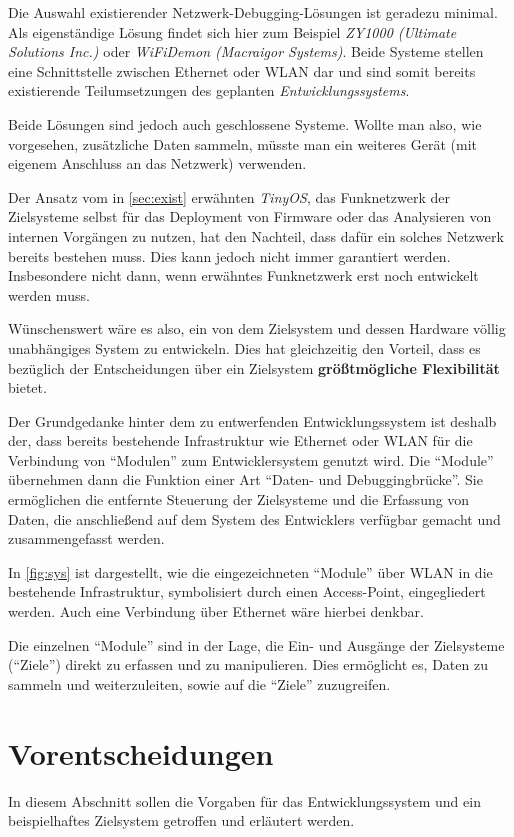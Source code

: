 Die Auswahl existierender Netzwerk-Debugging-Lösungen ist geradezu
minimal. Als eigenständige Lösung findet sich hier zum Beispiel \emph{ZY1000
(Ultimate Solutions Inc.)}\cite{ULT} oder \emph{WiFiDemon (Macraigor
Systems)}\cite{MAC}. Beide Systeme stellen eine Schnittstelle zwischen Ethernet
oder WLAN dar und sind somit bereits existierende Teilumsetzungen des geplanten
\emph{Entwicklungssystems}.

Beide Lösungen sind jedoch auch geschlossene Systeme. Wollte man also, wie
vorgesehen, zusätzliche Daten sammeln, müsste man ein weiteres Gerät (mit
eigenem Anschluss an das Netzwerk) verwenden.

Der Ansatz vom in \autoref{sec:exist} erwähnten \emph{TinyOS}, das Funknetzwerk
der Zielsysteme selbst für das Deployment von Firmware oder das Analysieren von
internen Vorgängen zu nutzen, hat den Nachteil, dass dafür ein solches Netzwerk
bereits bestehen muss. Dies kann jedoch nicht immer garantiert werden.
Insbesondere nicht dann, wenn erwähntes Funknetzwerk erst noch entwickelt werden
muss.

Wünschenswert wäre es also, ein von dem Zielsystem und dessen Hardware völlig
unabhängiges System zu entwickeln. Dies hat gleichzeitig den Vorteil, dass es
bezüglich der Entscheidungen über ein Zielsystem \textbf{größtmögliche
Flexibilität} bietet.

Der Grundgedanke hinter dem zu entwerfenden Entwicklungssystem ist
deshalb der, dass bereits bestehende Infrastruktur wie Ethernet oder WLAN für
die Verbindung von "`Modulen"' zum Entwicklersystem genutzt wird. Die
"`Module"' übernehmen dann die Funktion einer Art "`Daten- und
Debuggingbrücke"'. Sie ermöglichen die entfernte Steuerung der Zielsysteme
und die Erfassung von Daten, die anschließend auf dem System des Entwicklers
verfügbar gemacht und zusammengefasst werden.

In \autoref{fig:sys} ist dargestellt, wie die eingezeichneten "`Module"'
über WLAN in die bestehende Infrastruktur, symbolisiert durch einen
Access-Point, eingegliedert werden. Auch eine Verbindung über Ethernet wäre
hierbei denkbar.

Die einzelnen "`Module"' sind in der Lage, die Ein- und Ausgänge
der Zielsysteme ("`Ziele"') direkt zu erfassen und zu manipulieren. Dies
ermöglicht es, Daten zu sammeln und weiterzuleiten, sowie auf die "`Ziele"'
zuzugreifen.
\section{Vorentscheidungen}
In diesem Abschnitt sollen die Vorgaben für das Entwicklungssystem und ein
beispielhaftes Zielsystem getroffen und erläutert werden.
